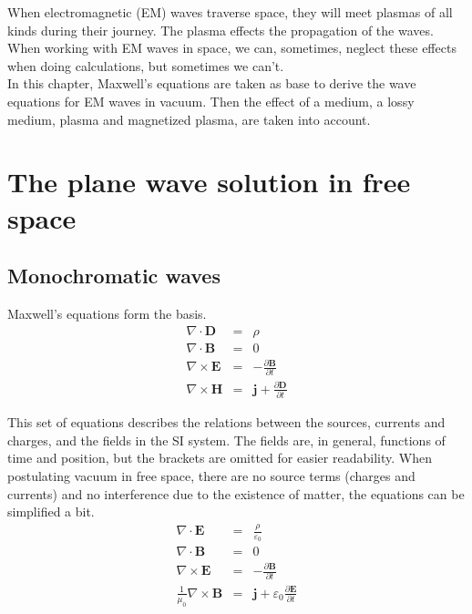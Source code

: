 \documentclass[a4paper,14pt]{extbook}
\begin{document}
When electromagnetic (EM) waves traverse space, they will meet plasmas of all kinds during their journey. The plasma effects the propagation of the waves. When working with EM waves in space, we can, sometimes, neglect these effects when doing calculations, but sometimes we can't.\\


In this chapter, Maxwell's equations are taken as base to derive the wave equations for EM waves in vacuum. Then the effect of a medium, a lossy medium, plasma and magnetized plasma, are taken into account.\\


\section{The plane wave solution in free space}
\subsection{Monochromatic waves}

Maxwell's equations form the basis.\\

\begin{eqnarray}
\nabla \cdot \mathbf{D}&=&\rho \label{maxwell1}\\
\nabla \cdot \mathbf{B}&=&0 \label{maxwell2} \\
\nabla \times \mathbf{E}&=&-\frac{\partial \mathbf{B}}{\partial t} \label{maxwell3} \\
\nabla \times \mathbf{H}&=&\mathbf{j}+ \frac{\partial \mathbf{D}}{\partial t} \label{maxwell4}
\end{eqnarray}


This set of equations describes the relations between the sources, currents and charges, and the fields in the SI system. The fields are, in general, functions of time and position, but the brackets are omitted for easier readability. When postulating vacuum in free space, there are no source terms (charges and currents) and no interference due to the existence of matter, the equations can be simplified a bit.\\

\begin{eqnarray}
\nabla \cdot \mathbf{E}&=& \frac{\rho}{\varepsilon_0} \label{maxwell_freespace1}\\
\nabla \cdot \mathbf{B}&=& 0 \label{maxwell_freespace2}\\
\nabla \times \mathbf{E}&=& -\frac{\partial \mathbf{B}}{\partial t} \label{maxwell_freespace3}\\
\frac{1}{\mu_0}\nabla \times \mathbf{B}&=&\mathbf{j}+\varepsilon_0 \frac{\partial \mathbf{E}}{\partial t} \label{maxwell_freespace4}
\end{eqnarray}
\end{document}
